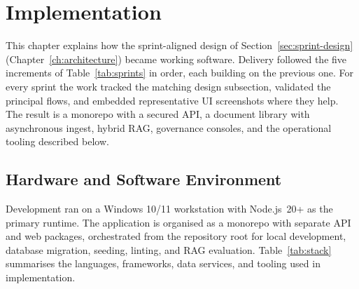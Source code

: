 \chapter{Implementation}
\label{ch:implementation}

This chapter explains how the sprint-aligned design of
Section~\ref{sec:sprint-design} (Chapter~\ref{ch:architecture}) became working
software. Delivery followed the five increments of Table~\ref{tab:sprints} in
order, each building on the previous one. For every sprint the work tracked the
matching design subsection, validated the principal flows, and embedded
representative UI screenshots where they help. The result is a monorepo with a
secured API, a document library with asynchronous ingest, hybrid RAG, governance
consoles, and the operational tooling described below.

\section{Hardware and Software Environment}

Development ran on a Windows 10/11 workstation with Node.js~20+ as the primary
runtime. The application is organised as a monorepo with separate API and web
packages, orchestrated from the repository root for local development, database
migration, seeding, linting, and RAG evaluation.
Table~\ref{tab:stack} summarises the languages, frameworks, data services, and
tooling used in implementation.


